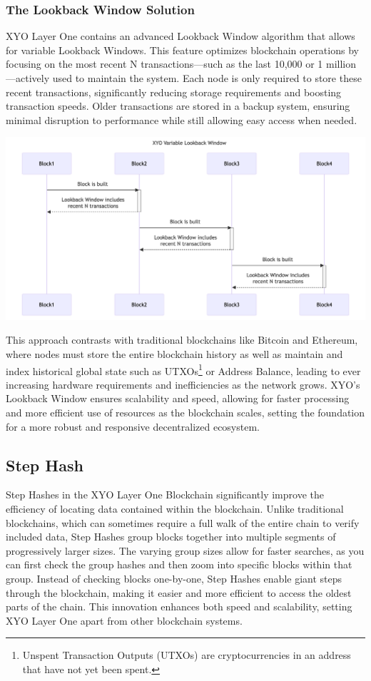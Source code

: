 \documentclass{article}
\begin{document}
\subsubsection{The Lookback Window Solution}
XYO Layer One contains an advanced Lookback Window algorithm that allows for
variable Lookback Windows. This feature optimizes blockchain operations by
focusing on the most recent N transactions—such as the last 10,000 or 1
million—actively used to maintain the system. Each node is only required to
store these recent transactions, significantly reducing storage requirements
and boosting transaction speeds. Older transactions are stored in a backup
system, ensuring minimal disruption to performance while still allowing easy
access when needed.

\begin{center}
    \includegraphics[width=15cm]{xyo-variable-lookback-window.png}
\end{center}

This approach contrasts with traditional blockchains like Bitcoin and Ethereum,
where nodes must store the entire blockchain history as well as maintain and
index historical global state such as UTXOs\footnote{Unspent Transaction
    Outputs (UTXOs) are cryptocurrencies in an address that have not yet been
    spent.} or Address Balance, leading to ever increasing hardware requirements
and inefficiencies as the network grows. XYO's Lookback Window ensures
scalability and speed, allowing for faster processing and more efficient use of
resources as the blockchain scales, setting the foundation for a more robust
and responsive decentralized ecosystem.

\subsection{Step Hash}
Step Hashes in the XYO Layer One Blockchain significantly improve the
efficiency of locating data contained within the blockchain. Unlike traditional
blockchains, which can sometimes require a full walk of the entire chain to
verify included data, Step Hashes group blocks together into multiple segments
of progressively larger sizes. The varying group sizes allow for faster
searches, as you can first check the group hashes and then zoom into specific
blocks within that group. Instead of checking blocks one-by-one, Step Hashes
enable giant steps through the blockchain, making it easier and more efficient
to access the oldest parts of the chain. This innovation enhances both speed
and scalability, setting XYO Layer One apart from other blockchain systems.
\end{document}
